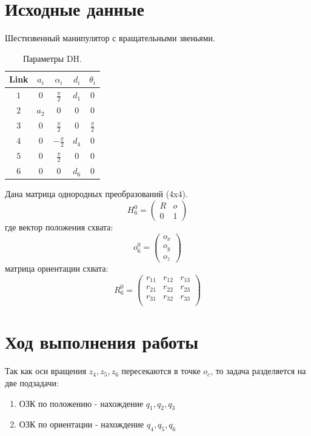 \documentclass[a4paper,14pt]{extreport}
\begin{document}
	\section{Исходные данные}
	Шестизвенный манипулятор с вращательными звеньями.
	\begin{table}[H]
		\caption{\label{tab:canonsummary}Параметры DH.}
		\begin{center}
			\begin{tabular}{|c|c|c|c|c|}
				\hline
				Link & $a_i$ & $\alpha_i $ & $d_i$ & $\theta_i$ \\
				\hline
				$1$ & $0$ & $\frac{\pi}{2}$ & $d_1$ & $0$ \\
				\hline
				$2$ & $a_2$ & $0$ & $0$ & $0$ \\
				\hline
				$3$ & $0$ & $\frac{\pi}{2}$ & $0$ & $\frac{\pi}{2}$ \\
				\hline
				$4$ & $0$ & $-\frac{\pi}{2}$ & $d_4$ & $0$ \\
				\hline
				$5$ & $0$ & $\frac{\pi}{2}$ & $0$ & $0$ \\
				\hline
				$6$ & $0$ & $0$ & $d_6$ & $0$ \\
				\hline
			\end{tabular}
		\end{center}
	\end{table} 
	Дана матрица однородных преобразований (4x4).
	\begin{equation}
		H^0_6 = 
		\begin{pmatrix}
			R & o\\
			0 & 1
		\end{pmatrix}
	\end{equation}
	где вектор положения схвата:
	\begin{equation}
		o^0_6 = 
		\begin{pmatrix}
			o_x\\
			o_y\\
			o_z
		\end{pmatrix}
	\end{equation}
	матрица ориентации схвата:
	\begin{equation}
		R^0_6 = 
		\begin{pmatrix}
			r_{11} & r_{12} & r_{13}\\
			r_{21} & r_{22} & r_{23}\\
			r_{31} & r_{32} & r_{33}\\
		\end{pmatrix}
	\end{equation}
	
	\section{Ход выполнения работы}
	Так как оси вращения $z_4, z_5, z_6$ пересекаются в точке $o_c$, то задача разделяется на две подзадачи:
	\begin{enumerate}
		\item ОЗК по положению - нахождение $q_1, q_2, q_3$
		\item ОЗК по ориентации - нахождение $q_4, q_5, q_6$	
	\end{enumerate}
\end{document}
